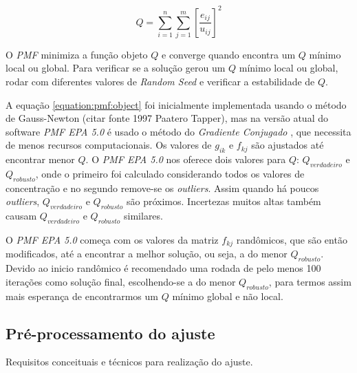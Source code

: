 \begin{equation}
  Q = \sum_{i=1}^n \sum_{j=1}^m  \left[ \frac{e_{ij}} {u_{ij}} \right] ^2
  \label{equation:pmf:object}
\end{equation}

O \textit{PMF} minimiza a função objeto $Q$ e converge quando encontra um $Q$ mínimo local ou global. 
Para verificar se a solução gerou um $Q$ mínimo local ou global, rodar com diferentes valores de \textit{Random Seed} e verificar a estabilidade de $Q$.

A equação \ref{equation:pmf:object} foi inicialmente implementada usando o método de Gauss-Newton \citep{wiki:gaussnewton} (citar fonte 1997 Paatero Tapper), mas na versão atual do software \textit{PMF EPA 5.0} é usado o método do \textit{Gradiente Conjugado} \citep{wiki:gradienteconjugado}, que necessita de menos recursos computacionais. 
Os valores de $g_{ik}$ e $f_{kj}$ são ajustados até encontrar menor $Q$. O \textit{PMF EPA 5.0} nos oferece dois valores para $Q$: $Q_{verdadeiro}$ e $Q_{robusto}$, onde o primeiro foi calculado considerando todos os valores de concentração e no segundo remove-se os \textit{outliers}. Assim quando há poucos \textit{outliers}, $Q_{verdadeiro}$ e $Q_{robusto}$ são próximos. Incertezas muitos altas também causam $Q_{verdadeiro}$ e $Q_{robusto}$ similares.

O \textit{PMF EPA 5.0} começa com os valores da matriz $f_{kj}$ randômicos, que são então modificados, até a encontrar a melhor solução, ou seja, a do menor $Q_{robusto}$. Devido ao inicio randômico é recomendado uma rodada de pelo menos 100 iterações como solução final, escolhendo-se a do menor $Q_{robusto}$, para termos assim mais esperança de encontrarmos um $Q$ mínimo global e não local.

\subsection{Pré-processamento do ajuste}
Requisitos conceituais e técnicos para realização do ajuste.


